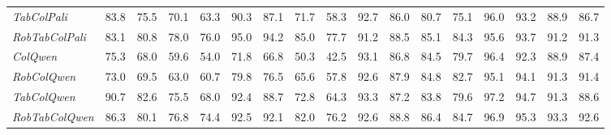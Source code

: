 \begin{table*}[t]
\begin{tabular*}{1.03\linewidth}{@{\extracolsep{\fill}}l|cccc|cccc|cccc|cccc}
\hspace{0.3cm}\textit{TabColPali} & 
83.8 & 75.5 & 70.1 & 63.3 & 
90.3 & 87.1 & 71.7 & 58.3 & 
92.7 & 86.0 & 80.7 & 75.1 & 
96.0 & 93.2 & 88.9 & 86.7 \\

\hspace{0.3cm}\textit{RobTabColPali} & 
83.1 & 80.8 & 78.0 & 76.0 & 
95.0 & 94.2 & 85.0 & 77.7 & 
91.2 & 88.5 & 85.1 & 84.3 & 
95.6 & 93.7 & 91.2 & 91.3 \\
\addlinespace
\textit{ColQwen} & 
75.3 & 68.0 & 59.6 & 54.0 & 
71.8 & 66.8 & 50.3 & 42.5 & 
93.1 & 86.8 & 84.5 & 79.7 & 
96.4 & 92.3 & 88.9 & 87.4 \\

\hspace{0.3cm}\textit{RobColQwen} & 
73.0 & 69.5 & 63.0 & 60.7 & 
79.8 & 76.5 & 65.6 & 57.8 & 
92.6 & 87.9 & 84.8 & 82.7 & 
95.1 & 94.1 & 91.3 & 91.4 \\

\hspace{0.3cm}\textit{TabColQwen} & 
90.7 & 82.6 & 75.5 & 68.0 & 
92.4 & 88.7 & 72.8 & 64.3 & 
93.3 & 87.2 & 83.8 & 79.6 & 
97.2 & 94.7 & 91.3 & 88.6 \\

\hspace{0.3cm}\textit{RobTabColQwen} & 
86.3 & 80.1 & 76.8 & 74.4 & 
92.5 & 92.1 & 82.0 & 76.2 & 
92.6 & 88.8 & 86.4 & 84.7 & 
96.9 & 95.3 & 93.3 & 92.6 \\

\bottomrule
\end{tabular*}
\label{Table:rephrasing_benchmarks_recall5}
\end{table*}


